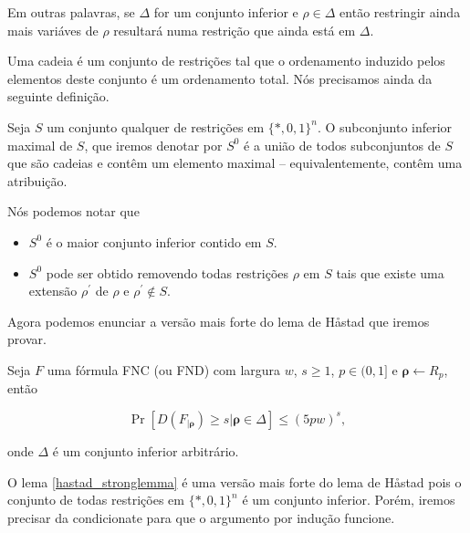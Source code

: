 Em outras palavras, se $\Delta$ for um conjunto inferior e $\rho \in \Delta$ então restringir ainda mais variáves de $\rho$ resultará numa restrição que ainda está em $\Delta$.

Uma cadeia é um conjunto de restrições tal que o ordenamento induzido pelos elementos deste conjunto é um ordenamento total. Nós precisamos ainda da seguinte definição.

\begin{defi} 

Seja $S$ um conjunto qualquer de restrições em $\{*, 0, 1\}^{n}$. O subconjunto inferior maximal de $S$, que iremos denotar por $S^{0}$ é a união de todos subconjuntos de $S$ que são cadeias e contêm um elemento maximal -- equivalentemente, contêm uma atribuição.

\end{defi}

Nós podemos notar que

\begin{itemize}

    \item $S^{0}$ é o maior conjunto inferior contido em $S$.
    
    \item $S^{0}$ pode ser obtido removendo todas restrições $\rho$ em $S$ tais que existe uma extensão $\rho^{\prime}$ de $\rho$ e $\rho^{\prime} \not\in S$.

\end{itemize}

Agora podemos enunciar a versão mais forte do lema de H{\aa}stad que iremos provar.

\begin{lema} \label{hastad_stronglemma}

Seja $F$ uma fórmula FNC (ou FND) com largura $w$, $s \geq 1$, $p \in (0, 1]$ e $\boldsymbol{\rho} \leftarrow R_{p}$, então

\begin{equation*}
	\Pr[D(F_{\lvert \boldsymbol{\rho}}) \geq s \lvert \boldsymbol{\rho} \in \Delta] \leq (5pw)^{s},
\end{equation*}

onde $\Delta$ é um conjunto inferior arbitrário.

\end{lema}

O lema \ref{hastad_stronglemma} é uma versão mais forte do lema de Håstad pois o conjunto de todas restrições em $\{*, 0, 1\}^{n}$ é um conjunto inferior. Porém, iremos precisar da condicionate para que o argumento por indução funcione.

